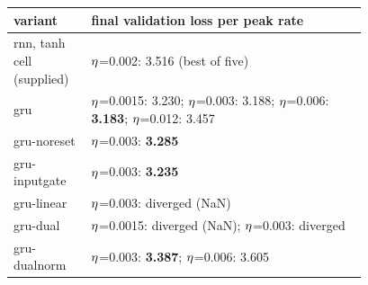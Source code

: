 \begin{tabular}{lp{0.78\linewidth}}\toprule
variant & final validation loss per peak rate\\\midrule
rnn, tanh cell (supplied) & $\eta$=0.002: 3.516 (best of five) \\
gru & $\eta$=0.0015: 3.230; $\eta$=0.003: 3.188; $\eta$=0.006: \textbf{3.183}; $\eta$=0.012: 3.457 \\
gru-noreset & $\eta$=0.003: \textbf{3.285} \\
gru-inputgate & $\eta$=0.003: \textbf{3.235} \\
gru-linear & $\eta$=0.003: diverged (NaN) \\
gru-dual & $\eta$=0.0015: diverged (NaN); $\eta$=0.003: diverged \\
gru-dualnorm & $\eta$=0.003: \textbf{3.387}; $\eta$=0.006: 3.605 \\
\bottomrule\end{tabular}
